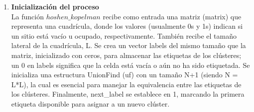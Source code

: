 \documentclass[12pt,a4paper]{article}
\begin{document}
\begin{enumerate}[label=\textbf{\arabic*)}, ref=\arabic*)]
    \item \textbf{Inicialización del proceso}\\
    La función $hoshen\_kopelman$ recibe como entrada una matriz (matrix) que representa una cuadrícula, donde los valores (usualmente 0s y 1s) indican si un sitio está vacío u ocupado, respectivamente. También recibe el tamaño lateral de la cuadrícula, L. Se crea un vector labels del mismo tamaño que la matriz, inicializado con ceros, para almacenar las etiquetas de los clústeres; un 0 en labels significa que la celda está vacía o aún no ha sido etiquetada. Se inicializa una estructura UnionFind (uf) con un tamaño N+1 (siendo N = L*L), la cual es esencial para manejar la equivalencia entre las etiquetas de los clústeres. Finalmente, next\_label se establece en 1, marcando la primera etiqueta disponible para asignar a un nuevo clúster.
    

\end{enumerate}
\end{document}
